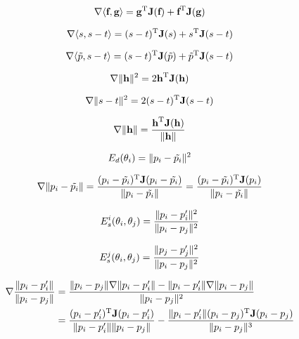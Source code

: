 \documentclass[11pt]{article} %
\DeclarePairedDelimiter{\norm}{\lVert}{\rVert}
\begin{document}
\begin{equation}
\nabla\langle \textbf{f}, \textbf{g} \rangle = \textbf{g}^{\textnormal{T}} \textbf{J}(\textbf{f}) + \textbf{f}^{\textnormal{T}} \textbf{J}(\textbf{g})
\end{equation}

\begin{equation}
\nabla\langle s, s - t \rangle = (s - t)^{\textnormal{T}} \textbf{J}(s) + s ^{\textnormal{T}} \textbf{J}(s - t)
\end{equation}

\begin{equation}
\nabla\langle \tilde{p}, s - t \rangle = (s - t)^{\textnormal{T}} \textbf{J}(\tilde{p}) + \tilde{p} ^{\textnormal{T}} \textbf{J}(s - t)
\end{equation}

\begin{equation}
\nabla\norm{\textbf{h}}^{2} = 2 \textbf{h}^{\textnormal{T}} \textbf{J}(\textbf{h})
\end{equation}

\begin{equation}
\nabla\norm{s - t}^{2} = 2 (s - t)^{\textnormal{T}} \textbf{J}(s - t)
\end{equation}

\begin{equation}
\nabla\norm{\textbf{h}} = \frac{\textbf{h}^{\textnormal{T}} \textbf{J}(\textbf{h})}{\norm{\textbf{h}}}
\end{equation}

\begin{equation}
E_{d}(\theta_i) = \norm{p_i - \tilde{p_i}}^{2}
\end{equation}

\begin{equation}
\nabla\norm{p_i - \tilde{p_i}} = \frac{(p_i - \tilde{p_i})^{\textnormal{T}} \textbf{J}(p_i - \tilde{p_i})}{\norm{p_i - \tilde{p_i}}} = \frac{(p_i - \tilde{p_i})^{\textnormal{T}} \textbf{J}(p_i)}{\norm{p_i - \tilde{p_i}}}
\end{equation}

\begin{equation}
E_{s}^{i}(\theta_i, \theta_j) = \frac{\norm{p_i - p_i'}^{2}}{\norm{p_i - p_j}^{2}}
\end{equation}

\begin{equation}
E_{s}^{j}(\theta_i, \theta_j) = \frac{\norm{p_j - p_j'}^{2}}{\norm{p_i - p_j}^{2}}
\end{equation}

\begin{align}
\nabla\frac{\norm{p_i - p_i'}}{\norm{p_i - p_j}} &= \frac{\norm{p_i - p_j}\nabla\norm{p_i - p_i'} - \norm{p_i - p_i'}\nabla\norm{p_i - p_j} }{\norm{p_i - p_j}^{2}}\\
&= \frac{(p_i - p_i')^{\textnormal{T}}\textbf{J}(p_i - p_i')}{\norm{p_i - p_i'} \norm{p_i - p_j}} - \frac{\norm{p_i - p_i'}(p_i - p_j)^{\textnormal{T}}\textbf{J}(p_i - p_j)}{\norm{p_i - p_j}^{3}}
\end{align}
\end{document}
